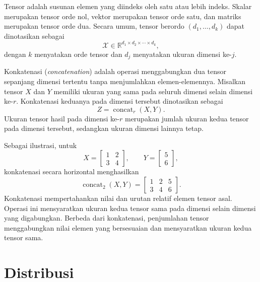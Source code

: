 \begin{definisi}
\label{def:tensor}
Tensor adalah susunan elemen yang diindeks oleh satu atau lebih indeks.
Skalar merupakan tensor orde nol, vektor merupakan tensor orde satu,
dan matriks merupakan tensor orde dua. Secara umum, tensor berordo
$(d_1,\ldots,d_k)$ dapat dinotasikan sebagai
\begin{equation}
\mathcal{X}\in
\mathbb{R}^{d_1\times d_2\times\cdots\times d_k},
\label{eq:tensor}
\end{equation}
dengan $k$ menyatakan orde tensor dan $d_j$ menyatakan ukuran dimensi
ke-$j$.
\end{definisi}

\begin{definisi}
\label{def:konkatenasi}

Konkatenasi (\textit{concatenation}) adalah operasi menggabungkan
dua tensor sepanjang dimensi tertentu tanpa menjumlahkan elemen-elemennya.
Misalkan tensor $X$ dan $Y$ memiliki ukuran yang sama pada seluruh
dimensi selain dimensi ke-$r$. Konkatenasi keduanya pada dimensi
tersebut dinotasikan sebagai
\begin{equation}
Z=\operatorname{concat}_r(X,Y).
\label{eq:konkatenasi}
\end{equation}
Ukuran tensor hasil pada dimensi ke-$r$ merupakan jumlah ukuran
kedua tensor pada dimensi tersebut, sedangkan ukuran dimensi lainnya
tetap.

Sebagai ilustrasi, untuk
\[
X=
\begin{bmatrix}
1 & 2\\
3 & 4
\end{bmatrix},
\qquad
Y=
\begin{bmatrix}
5\\
6
\end{bmatrix},
\]
konkatenasi secara horizontal menghasilkan
\[
\operatorname{concat}_2(X,Y)
=
\begin{bmatrix}
1 & 2 & 5\\
3 & 4 & 6
\end{bmatrix}.
\]
Konkatenasi mempertahankan nilai dan urutan relatif elemen tensor
asal. Operasi ini mensyaratkan ukuran kedua tensor sama pada dimensi
selain dimensi yang digabungkan. Berbeda dari konkatenasi,
penjumlahan tensor menggabungkan nilai elemen yang bersesuaian dan
mensyaratkan ukuran kedua tensor sama.

\end{definisi}


\section{Distribusi}
\label{sec:distribusi}


